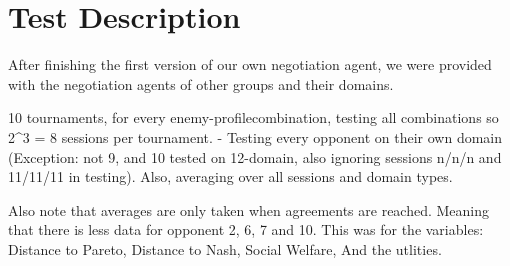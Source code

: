 \section{Test Description}

After finishing the first version of our own negotiation agent, we were provided with the negotiation agents of other groups and their domains.

10 tournaments, for every enemy-profilecombination, testing all combinations so 2^3 = 8 sessions per tournament. - Testing every opponent on their own domain (Exception: not 9, and 10 tested on 12-domain, also ignoring sessions n/n/n and 11/11/11 in testing). Also, averaging over all sessions and domain types.

Also note that averages are only taken when agreements are reached. Meaning that there is less data for opponent 2, 6, 7 and 10. This was for the variables: Distance to Pareto, Distance to Nash, Social Welfare, And the utlities.